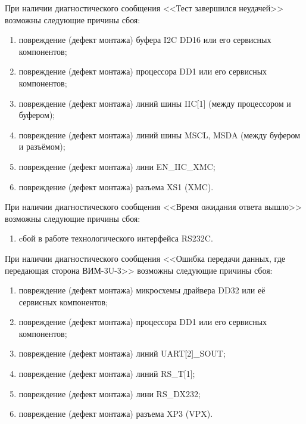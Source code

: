   \begin{sloppypar}
    \subpoint При наличии диагностического сообщения <<Тест завершился неудачей>> возможны следующие причины сбоя:
      \begin{enumerate}	  
	\item повреждение (дефект монтажа) буфера I2C DD16 или его сервисных компонентов;
	\item повреждение (дефект монтажа) процессора DD1 или его сервисных компонентов;
	\item повреждение (дефект монтажа) линий шины IIC[1] (между процессором и буфером);
	\item повреждение (дефект монтажа) линий шины MSCL, MSDA (между буфером и разъёмом);
	\item повреждение (дефект монтажа) лини EN\_IIC\_XMC;
	\item повреждение (дефект монтажа) разъема XS1 (XMC).
      \end{enumerate}
      
    \subpoint При наличии диагностического сообщения <<Время ожидания ответа вышло>> возможны следующие причины сбоя:
      \begin{enumerate}
	\item cбой в работе технологического интерфейса RS232C.
      \end{enumerate} 
    
    \end{sloppypar}
    
    \subpoint При наличии диагностического сообщения <<Ошибка передачи данных, где передающая сторона ВИМ-3U-3>> возможны следующие причины сбоя:
      \begin{enumerate}
	\item повреждение (дефект монтажа) микросхемы драйвера DD32 или её сервисных компонентов;
	\item повреждение (дефект монтажа) процессора DD1 или его сервисных компонентов;
	\item повреждение (дефект монтажа) линий UART[2]\_SOUT;
	\item повреждение (дефект монтажа) линий RS\_T[1];
	\item повреждение (дефект монтажа) лини RS\_DX232;
	\item повреждение (дефект монтажа) разъема XP3 (VPX).
      \end{enumerate}
      
